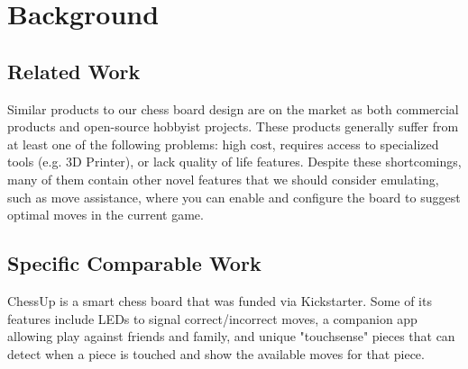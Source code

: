 \documentclass[11pt,journal]{IEEEtran}
\begin{document}


\section{Background}

\subsection{Related Work}

Similar products to our chess board design are on the market as both commercial products and open-source hobbyist projects. These products generally suffer from at least one of the following problems: high cost, requires access to specialized tools (e.g. 3D Printer), or lack quality of life features. Despite these shortcomings, many of them contain other novel features that we should consider emulating, such as move assistance, where you can enable and configure the board to suggest optimal moves in the current game.






\subsection{Specific Comparable Work}
ChessUp is a smart chess board that was funded via Kickstarter. Some of its features include LEDs to signal correct/incorrect moves, a companion app allowing play against friends and family, and unique "touchsense" pieces that can detect when a piece is touched and show the available moves for that piece.\cite{chessup} 
\end{document}
